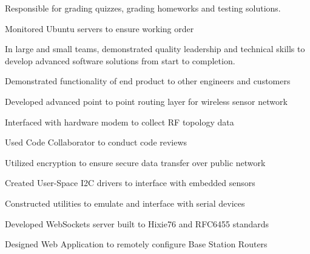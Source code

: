 \documentclass[letterpaper]{deedy-resume} %
\begin{document}
\begin{minipage}[t]{0.66\textwidth}
\sectionspace %


\vspace{\topsep} %
\begin{tightitemize}
\item Responsible for grading quizzes, grading homeworks and testing solutions.
\item Monitored Ubuntu servers to ensure working order
\end{tightitemize}

\sectionspace %



\vspace{\topsep} %
In large and small teams, demonstrated quality leadership and technical skills to develop advanced
software solutions from start to completion.
\vspace{\topsep} %
\vspace{\topsep} %
\begin{tightitemize}
\item Demonstrated functionality of end product to other engineers and customers
\item Developed advanced point to point routing layer for wireless sensor network
\item Interfaced with hardware modem to collect RF topology data
\item Used Code Collaborator to conduct code reviews
\item Utilized encryption to ensure secure data transfer over public network
\item Created User-Space I2C drivers to interface with embedded sensors
\item Constructed utilities to emulate and interface with serial devices
\item Developed WebSockets server built to Hixie76 and RFC6455 standards
\item Designed Web Application to remotely configure Base Station Routers
\end{tightitemize}


\end{minipage}
\end{document}
